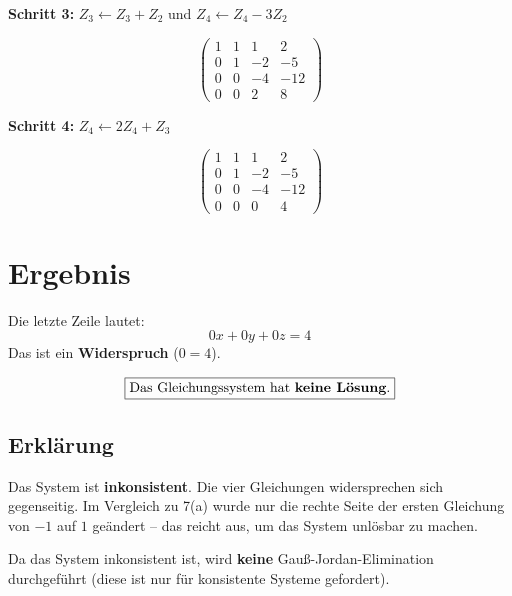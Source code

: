 \documentclass[a4paper,12pt]{article}
\begin{document}
\textbf{Schritt 3:} $Z_3 \leftarrow Z_3 + Z_2$ und $Z_4 \leftarrow Z_4 - 3Z_2$

\[
\left(\begin{array}{ccc|c}
1 & 1 & 1 & 2 \\
0 & 1 & -2 & -5 \\
0 & 0 & -4 & -12 \\
0 & 0 & 2 & 8
\end{array}\right)
\]

\textbf{Schritt 4:} $Z_4 \leftarrow 2Z_4 + Z_3$

\[
\left(\begin{array}{ccc|c}
1 & 1 & 1 & 2 \\
0 & 1 & -2 & -5 \\
0 & 0 & -4 & -12 \\
0 & 0 & 0 & 4
\end{array}\right)
\]

\section*{Ergebnis}

Die letzte Zeile lautet:
\[
0x + 0y + 0z = 4
\]
Das ist ein \textbf{Widerspruch} ($0 = 4$).

\[
\boxed{\text{Das Gleichungssystem hat \textbf{keine Lösung}.}}
\]

\subsection*{Erklärung}

Das System ist \textbf{inkonsistent}. Die vier Gleichungen widersprechen sich gegenseitig.
Im Vergleich zu 7(a) wurde nur die rechte Seite der ersten Gleichung von $-1$ auf $1$ geändert --
das reicht aus, um das System unlösbar zu machen.

Da das System inkonsistent ist, wird \textbf{keine} Gauß-Jordan-Elimination durchgeführt
(diese ist nur für konsistente Systeme gefordert).
\end{document}
